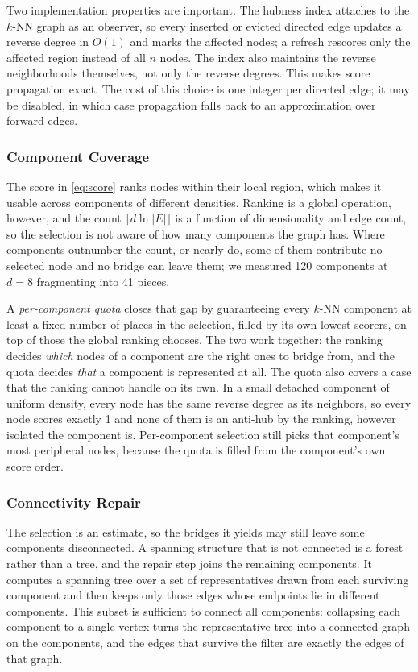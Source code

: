 \documentclass{ieeeaccess}
\begin{document}
Two implementation properties are important. The hubness index attaches to
the $k$-NN graph as an observer, so every inserted or evicted directed edge
updates a reverse degree in $O(1)$ and marks the affected nodes; a refresh
rescores only the affected region instead of all $n$ nodes. The index also
maintains the reverse neighborhoods themselves, not only the reverse degrees.
This makes score propagation exact. The cost of this choice is one integer per
directed edge; it may be disabled, in which case propagation falls back to an
approximation over forward edges.

\subsubsection{Component Coverage}

The score in \eqref{eq:score} ranks nodes within their local region, which
makes it usable across components of different densities. Ranking is a
global operation, however, and the count $\lceil d \ln |E| \rceil$ is a function
of dimensionality and edge count, so the selection is not aware of how many
components the graph has. Where components outnumber the count, or nearly do,
some of them contribute no selected node and no bridge can leave them; we
measured 120 components at $d = 8$ fragmenting into 41 pieces.

A \emph{per-component quota} closes that gap by guaranteeing every $k$-NN
component at least a fixed number of places in the selection, filled by its own
lowest scorers, on top of those the global ranking chooses. The two work
together: the ranking decides \emph{which} nodes of a component are the right
ones to bridge from, and the quota decides \emph{that} a component is
represented at all. The quota also covers a case that the ranking cannot handle
on its own. In a small detached component of uniform density, every node
has the same reverse degree as its neighbors, so every node scores exactly 1
and none of them is an anti-hub by the ranking, however isolated the component
is. Per-component selection still picks that component's most peripheral nodes,
because the quota is filled from the component's own score order.

\subsubsection{Connectivity Repair}

The selection is an estimate, so the bridges it yields may still leave some
components disconnected. A spanning structure that is not connected is a forest
rather than a tree, and the repair step joins the remaining components. It
computes a spanning tree over a set of representatives drawn from each surviving
component and then keeps only those edges whose endpoints lie in different
components. This subset is sufficient to connect all components: collapsing each
component to a single vertex turns the representative tree into a connected
graph on the components, and the edges that survive the filter are exactly the
edges of that graph.
\end{document}
